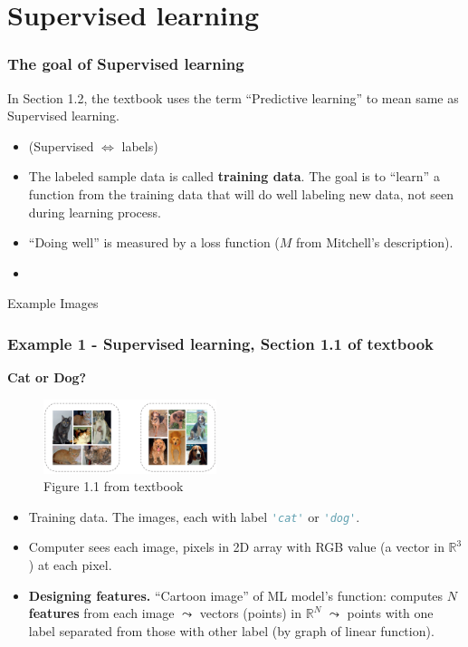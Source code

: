 \documentclass{beamer}
\theoremstyle{example}
\newcommand{\st}[1]{\lstinline[language=Python,basicstyle=\ttfamily,stringstyle=\small\color{strings}]!#1!}
\newcommand{\bb}[1]{\mathbb{#1}}
\begin{document}
\section{Supervised learning}

\begin{frame}
\frametitle{The goal of Supervised learning}
In Section 1.2, the textbook uses the term ``Predictive learning'' to mean same as Supervised learning. 
\begin{itemize}
    \item (Supervised $\iff$ labels) 
    \pause
    \item The labeled sample data is called \textbf{training data}. The goal is to ``learn'' a function from the training data that will do well labeling new data, not seen during learning process. 
    \pause
    \item ``Doing well'' is measured by a loss function ($M$ from Mitchell's description). 
    \item {}
\end{itemize}
\end{frame}

\begin{frame}[standout]
    Example Images
\end{frame}

\begin{frame}
\frametitle{Example 1 - Supervised learning, Section 1.1 of textbook}
\textbf{Cat or Dog?}

\begin{figure}
\includegraphics[width=0.45\textwidth]{../../Images/Fig1-1.png}
\caption*{Figure 1.1 from textbook}
\end{figure}

\begin{itemize}
    \item Training data. The images, each with label \st{'cat'} or \st{'dog'}.
    \pause
    \item Computer sees each image, pixels in 2D array with RGB value (a vector in $\bb R^3$) at each pixel.
    \pause
    \item \textbf{Designing features.} ``Cartoon image'' of ML model's function: computes $N$ \textbf{features} from each image $\leadsto$ vectors (points) in $\bb R^N$ $\leadsto$ points with one label separated from those with other label (by graph of linear function).
\end{itemize}
\end{frame}
\end{document}
